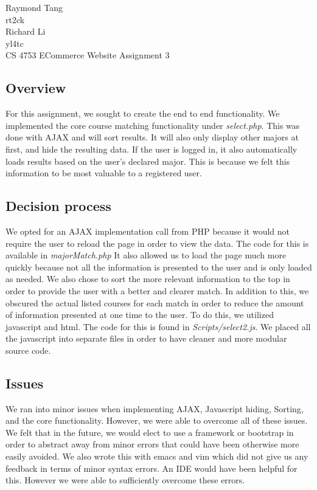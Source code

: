 \documentclass{article}
\begin{document}
\begin{singlespace}
\noindent Raymond Tang\\
rt2ck\\
Richard Li\\
yl4tc\\
CS 4753 ECommerce Website Assignment 3
\end{singlespace}

\begin{doublespace}
\subsection*{Overview}
\indent For this assignment, we sought to create the end to end functionality. We implemented the core course matching functionality under \emph{select.php}. This was done with AJAX and will sort results. It will also only display other majors at first, and hide the resulting data. If the user is logged in, it also automatically loads results based on the user's declared major. This is because we felt this information to be most valuable to a registered user.\\

\subsection*{Decision process}
\indent We opted for an AJAX implementation call from PHP because it would not require the user to reload the page in order to view the data. The code for this is available in \emph{majorMatch.php} It also allowed us to load the page much more quickly because not all the information is presented to the user and is only loaded as needed. We also chose to sort the more relevant information to the top in order to provide the user with a better and clearer match. In addition to this, we obscured the actual listed courses for each match in order to reduce the amount of information presented at one time to the user. To do this, we utilized javascript and html. The code for this is found in \emph{Scripts/select2.js}. We placed all the javascript into separate files in order to have cleaner and more modular source code.\\

\subsection*{Issues}
\indent We ran into minor issues when implementing AJAX, Javascript hiding, Sorting, and the core functionality. However, we were able to overcome all of these issues. We felt that in the future, we would elect to use a framework or bootstrap in order to abstract away from minor errors that could have been otherwise more easily avoided. We also wrote this with emacs and vim which did not give us any feedback in terms of minor syntax errors. An IDE would have been helpful for this. However we were able to sufficiently overcome these errors.\\

\end{doublespace}
\end{document}
